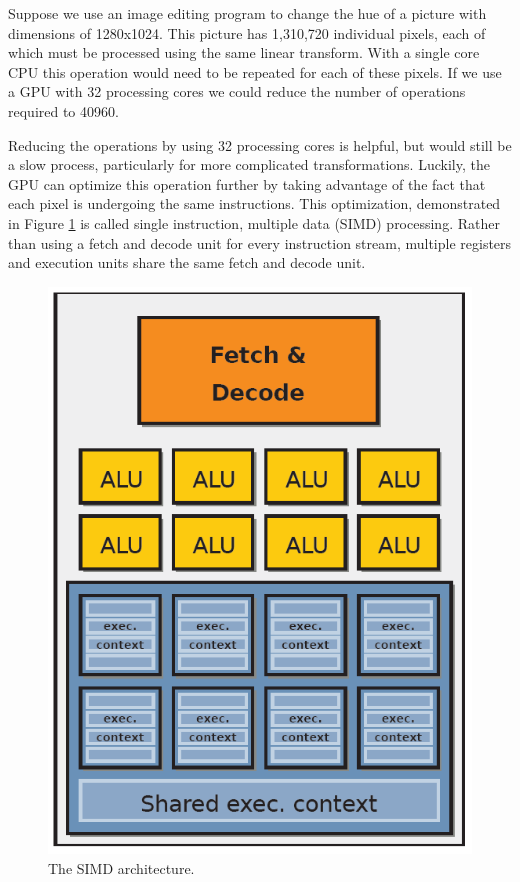 Suppose we use an image editing program to change the hue of a picture with dimensions of 1280x1024. This picture has 1,310,720 individual pixels, each of which must be processed using the same linear transform. With a single core CPU this operation would need to be repeated for each of these pixels. If we use a GPU with 32 processing cores we could reduce the number of operations required to 40960.

Reducing the operations by using 32 processing cores is helpful, but would still be a slow process, particularly for more complicated transformations. Luckily, the GPU can optimize this operation further by taking advantage of the fact that each pixel is undergoing the same instructions. This optimization, demonstrated in Figure \ref{fig:simd} is called single instruction, multiple data (SIMD) processing. Rather than using a fetch and decode unit for every instruction stream, multiple registers and execution units share the same fetch and decode unit.

\begin{figure}
    \centering
	\includegraphics[height=0.25\paperheight]{SIMD.png}
    \caption{The SIMD architecture. \cite{gpgpu}}
	\label{fig:simd}
\end{figure}

